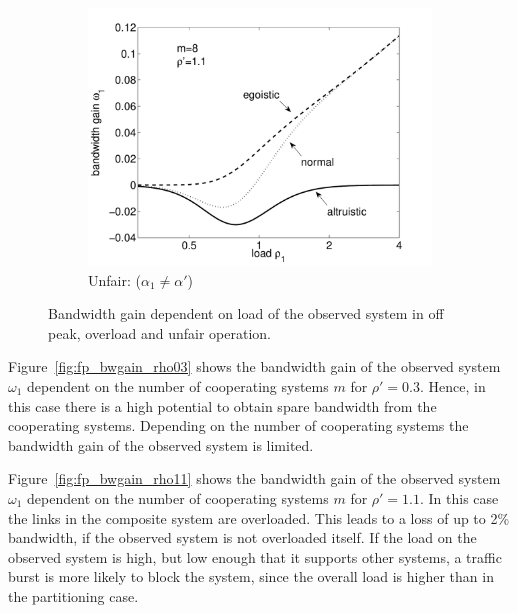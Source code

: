 \begin{figure}[tb]
\begin{subfigure}{.49\textwidth}
  \centering
\includegraphics[width=\linewidth]{aggregation/performance_model/figures/fp_bwgain_prio11}
  	\caption{Unfair: ($\alpha_1 \neq \alpha'$)}
  	\label{fig:fp_bwgain_prio11}
\end{subfigure}
\caption{Bandwidth gain dependent on load of the observed system in off peak, overload and unfair operation.}
\label{fig:fp_bwgain}
\end{figure}

Figure~\ref{fig:fp_bwgain_rho03} shows the bandwidth gain of the observed system $\omega_1$ dependent on the number of cooperating systems $m$ for $\rho'=0.3$.
Hence, in this case there is a high potential to obtain spare bandwidth from the cooperating systems.
Depending on the number of cooperating systems the bandwidth gain of the observed system is limited.

Figure~\ref{fig:fp_bwgain_rho11} shows the bandwidth gain of the observed system $\omega_1$ dependent on the number of cooperating systems $m$ for $\rho'=1.1$.
In this case the links in the composite system are overloaded.
This leads to a loss of up to 2\% bandwidth, if the observed system is not overloaded itself.
If the load on the observed system is high, but low enough that it supports other systems, a traffic burst is more likely to block the system, since the overall load is higher than in the partitioning case.

